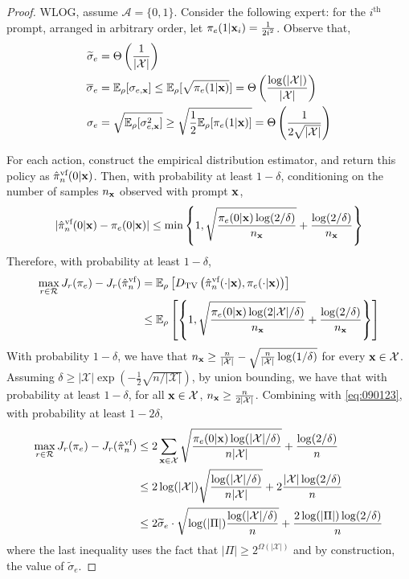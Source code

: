 \begin{proof}
WLOG, assume $\mathcal{A} = \{ 0,1 \}$. Consider the following expert: for the $i^{\text{th}}$ prompt, arranged in arbitrary order, let $\pi_e (1|\mathbf{x}_i) = \frac{1}{2i^2}$. Observe that,
\begin{align*}
    \widetilde{\sigma}_e &= \Theta \left( \frac{1}{|\mathcal{X}|} \right) \\
    \overline{\sigma}_e &= \mathbb{E}_\rho [\sigma_{e,\mathbf{x}}] \le \mathbb{E}_\rho [\sqrt{\pi_e (1|\mathbf{x})}] = \Theta \left( \frac{\log(|\mathcal{X}|)}{|\mathcal{X}|} \right) \\
    \sigma_e &= \sqrt{\mathbb{E}_\rho [\sigma_{e,\mathbf{x}}^2]} \ge \sqrt{\frac{1}{2}\mathbb{E}_\rho [\pi_e(1|\mathbf{x})]} = \Theta \left( \frac{1}{2 \sqrt{|\mathcal{X}|}} \right)
\end{align*}

For each action, construct the empirical distribution estimator, and return this policy as $\hat{\pi}_n^{\text{vf}} (0|\mathbf{x})$. Then, with probability at least $1-\delta$, conditioning on the number of samples $n_{\mathbf{x}}$ observed with prompt $\mathbf{x}$,
\begin{align*}
    | \hat{\pi}^{\text{vf}}_n (0|\mathbf{x}) - \pi_e (0|\mathbf{x}) | \le \min \left\{ 1, \sqrt{\frac{\pi_e (0|\mathbf{x}) \log(2/\delta)}{n_{\mathbf{x}}}} + \frac{ \log(2/\delta)}{n_{\mathbf{x}}} \right\}
\end{align*}
Therefore, with probability at least $1 - \delta$,
\begin{align}
    \max_{r \in \mathcal{R}} J_r (\pi_e) - J_r (\hat{\pi}^{\text{vf}}_n) &= \mathbb{E}_\rho \left[ D_{\mathrm{TV}} \left( \hat{\pi}^{\text{vf}}_n (\cdot|\mathbf{x}) , \pi_e (\cdot|\mathbf{x}) \right) \right] \nonumber\\
    &\le \mathbb{E}_\rho \left[ \left\{ 1, \sqrt{\frac{\pi_e (0|\mathbf{x}) \log(2|\mathcal{X}|/\delta)}{n_{\mathbf{x}}}} + \frac{ \log(2/\delta)}{n_{\mathbf{x}}} \right\} \right] \label{eq:090123}
\end{align}
With probability $1 - \delta$, we have that $n_{\mathbf{x}} \ge \frac{n}{|\mathcal{X}|} - \sqrt{\frac{n}{|\mathcal{X}|} \log (1/\delta)}$ for every $\mathbf{x} \in \mathcal{X}$. Assuming $\delta \ge |\mathcal{X}| \exp (-\frac{1}{2}\sqrt{n/|\mathcal{X}|})$, by union bounding, we have that with probability at least $1 - \delta$, for all $\mathbf{x} \in \mathcal{X}$, $n_{\mathbf{x}} \ge \frac{n}{2|\mathcal{X}|}$. Combining with \cref{eq:090123}, with probability at least $1-2\delta$,
\begin{align*}
    \max_{r \in \mathcal{R}} J_r (\pi_e) - J_r (\hat{\pi}^{\text{vf}}_n) &\le 2 \sum_{\mathbf{x} \in \mathcal{X}} \sqrt{\frac{\pi_e (0|\mathbf{x}) \log (|\mathcal{X}|/\delta)}{n |\mathcal{X}|}} + \frac{ \log(2/\delta)}{n}\\
    &\le 2\log(|\mathcal{X}|) \sqrt{\frac{\log (|\mathcal{X}|/\delta)}{n |\mathcal{X}|}} + 2\frac{|\mathcal{X}| \log(2/\delta)}{n} \\
    &\le 2\widetilde{\sigma}_e \cdot \sqrt{\log (|\Pi|) \frac{\log (|\mathcal{X}|/\delta)}{n}} + \frac{2\log(|\Pi|) \log(2/\delta)}{n}
\end{align*}
where the last inequality uses the fact that $|\Pi| \ge 2^{\Omega(|\mathcal{X}|)}$ and by construction, the value of $\widetilde{\sigma}_e$.

\end{proof}

